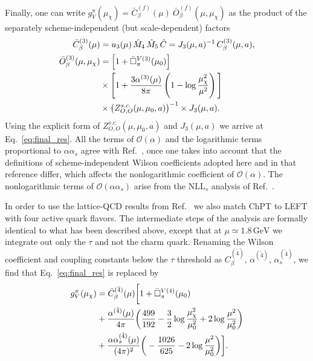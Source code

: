 \documentclass[prl,twocolumn,twoside,preprintnumbers,superscriptaddress,nofootinbib,letterpaper]{revtex4-1}
\newcommand{\GeV}{\,\text{GeV}}
\newcommand{\Order}{\mathcal{O}}
\begin{document}
Finally, one can write
$g_V^\pi (\mu_\chi) =  \bar  C^{(f)}_\beta (\mu)   \ \bar {O}^{(f)}_\beta (\mu, \mu_\chi)$
as the product of the separately  scheme-independent  (but scale-dependent)  factors
\begin{align}
 \bar C^{(3)}_\beta  (\mu) & =  u_3 (\mu) \, \hat M_4 \, \hat M_5  \,  \hat C  =   J_3 (\mu,a)^{-1} \, C^{(3)}_\beta (\mu, a),
 \nonumber \\
\bar {O}^{(3)}_\beta  (\mu, \mu_\chi)  &=
\Big[ 1+\bar\Box^{V(3)}_\pi(\mu_0) \Big] \notag\\
&\times
\Bigg[ 1 + \frac{3 \alpha^{(3)} (\mu)}{8 \pi}   \left( 1 - \log \frac{\mu_\chi^2}{\mu^2} \right)  \Bigg]
\nonumber \\
& \times  \left(  Z_{O,O}^{s.c.}  (\mu, \mu_0, a) \right)^{-1} \times  J_3 (\mu, a).
\end{align}
Using the explicit form of $  Z_{O,O}^{s.c.}  (\mu, \mu_0, a)$ and   $ J_3 (\mu, a) $
we arrive at Eq.~\eqref{eq:final_res}.
All the terms of $\Order (\alpha)$ and the logarithmic terms proportional to $\alpha \alpha_s$
agree with Ref.~\cite{Cirigliano:2023fnz}, once one takes into account that
the definitions of scheme-independent Wilson coefficients adopted here and
in that reference differ, which
affects the nonlogarithmic coefficient of $\Order (\alpha)$.
The nonlogarithmic terms of $\Order(\alpha \alpha_s)$ arise from the $\text{NLL}_s$ analysis of
Ref.~\cite{Gorbahn:2025ssv}.

In order to use the lattice-QCD results from Ref.~\cite{Yoo:2023gln} we also  match ChPT to LEFT with four active quark flavors.
The intermediate steps of the analysis are formally identical to what has been described above, except that at $\mu \simeq 1.8\GeV$
we integrate out only the $\tau$ and not the charm quark.
Renaming the Wilson coefficient and coupling constants below the $\tau$ threshold
as $C_\beta^{(\tilde{4})}$, $\alpha^{(\tilde{4})}$, $\alpha_s^{(\tilde{4})}$,
we  find that Eq.~\eqref{eq:final_res} is replaced by
\begin{align}
g_V^\pi (\mu_\chi)  & =
\bar C^{(\tilde{4})}_\beta  (\mu)
\bigg[1+\bar\Box^{V(4)}_\pi(\mu_0)\notag\\
&+ \frac{\alpha^{(\tilde{4})} (\mu)}{4 \pi}
  \bigg( \frac{499}{192}
  - \frac{3}{2}  \log \frac{\mu_\chi^2}{\mu_0^2}
 + 2  \log\frac{\mu^2}{\mu_0^2}
  \bigg)\notag\\
&+  \frac{\alpha \alpha_s^{(\tilde{4})} (\mu)}{(4 \pi)^2}
 \bigg(
 - \frac{1026}{625}  -  2  \log\frac{\mu^2}{\mu_0^2}
 \bigg)\bigg].
   \label{eq:final_res_4quarks}
\end{align}
\end{document}
